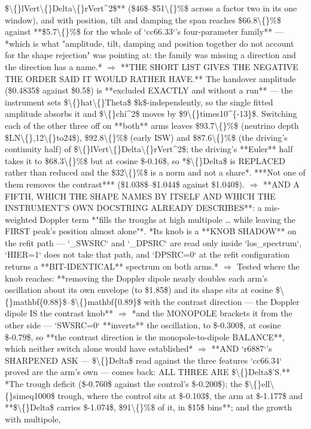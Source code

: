 \begin{description}
\$\textbackslash\{\}lVert\textbackslash\{\}Delta\textbackslash\{\}rVert\textasciicircum{}2\$** (\$46\$--\$51\textbackslash\{\}\%\$ across a factor two in its one window), and with position, tilt and damping the span reaches \$66.8\textbackslash\{\}\%\$ against **\$5.7\textbackslash\{\}\%\$ for the whole of `cc66.33`'s four-parameter family** --- *which is what "amplitude, tilt, damping and position together do not account for the shape rejection" was pointing at: the family was missing a direction and the direction has a name.* \ensuremath{\Rightarrow} **THE SHORT LIST GIVES THE NEGATIVE THE ORDER SAID IT WOULD RATHER HAVE.** The handover amplitude (\$0.4835\$ against \$0.5\$) is **excluded EXACTLY and without a run** --- the instrument sets \$\textbackslash\{\}hat\textbackslash\{\}Theta\$ \$k\$-independently, so the single fitted amplitude absorbs it and \$\textbackslash\{\}chi\textasciicircum{}2\$ moves by \$9\textbackslash\{\}times10\textasciicircum{}\{-13\}\$. Switching each of the other three off on **both** arms leaves \$93.7\textbackslash\{\}\%\$ (neutrino depth \$LN\textbackslash\{\},12\textbackslash\{\}to24\$), \$92.8\textbackslash\{\}\%\$ (early ISW) and \$87.6\textbackslash\{\}\%\$ (the driving's continuity half) of \$\textbackslash\{\}lVert\textbackslash\{\}Delta\textbackslash\{\}rVert\textasciicircum{}2\$; the driving's **Euler** half takes it to \$68.3\textbackslash\{\}\%\$ but at cosine \$-0.16\$, so  *\$\textbackslash\{\}Delta\$ is REPLACED rather than reduced and the \$32\textbackslash\{\}\%\$ is a norm and not a share*. ***Not one of them removes the contrast*** (\$1.038\$--\$1.044\$ against \$1.040\$). \ensuremath{\Rightarrow}  **AND A FIFTH, WHICH THE SHAPE NAMES BY ITSELF AND WHICH THE INSTRUMENT'S OWN DOCSTRING ALREADY DESCRIBES**: a mis-weighted Doppler term *"fills the troughs at high multipole \ldots{} while leaving the FIRST peak's position almost alone"*.  *Its knob is a **KNOB SHADOW** on the refit path --- `\_SWSRC` and `\_DPSRC` are read only inside `los\_spectrum`, `HIER=1` does not take that path, and `DPSRC=0` at the refit configuration returns a **BIT-IDENTICAL** spectrum on both arms.* \ensuremath{\Rightarrow} Tested where the knob reaches: **removing the Doppler dipole nearly doubles each arm's oscillation about its own envelope (to \$1.85\$) and its shape sits at cosine \$\textbackslash\{\}mathbf\{0.88\}\$--\$\textbackslash\{\}mathbf\{0.89\}\$ with the contrast direction --- the Doppler dipole IS the contrast knob** \ensuremath{\Rightarrow}  *and the MONOPOLE brackets it from the other side --- `SWSRC=0` **inverts** the oscillation, to \$-0.300\$, at cosine \$-0.79\$, so **the contrast direction is the monopole-to-dipole BALANCE**, which neither switch alone would have established* \ensuremath{\Rightarrow}  **AND `r6887`'s SHARPENED ASK --- \$\textbackslash\{\}Delta\$ read against the three features `cc66.34` proved are the arm's own --- comes back: ALL THREE ARE \$\textbackslash\{\}Delta\$'S.** *The trough deficit (\$-0.760\$ against the control's \$-0.200\$); the \$\textbackslash\{\}ell\textbackslash\{\}simeq1000\$ trough, where the control sits at \$-0.103\$, the arm at \$-1.177\$ and **\$\textbackslash\{\}Delta\$ carries \$-1.074\$, \$91\textbackslash\{\}\%\$ of it, in \$15\$ bins**; and the growth with multipole, 
\end{description}
